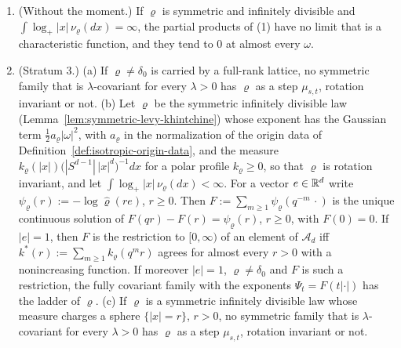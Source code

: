 \begin{proposition}
\begin{enumerate}
\item (Without the moment.) If $\varrho$ is symmetric and infinitely divisible and
$\int\log_+|x|\,\nu_\varrho(dx) = \infty$, the partial products of (1) have no limit that is a
characteristic function, and they tend to $0$ at almost every $\omega$.
\item (Stratum 3.) (a) If $\varrho \ne \delta_0$ is carried by a full-rank lattice, no symmetric
family that is $\lambda$-covariant for every $\lambda > 0$ has $\varrho$ as a step $\mu_{s,t}$,
rotation invariant or not. (b) Let $\varrho$ be the symmetric infinitely divisible law
(Lemma~\ref{lem:symmetric-levy-khintchine}) whose exponent has the Gaussian term $\tfrac12a_\varrho|\omega|^2$, with $a_\varrho$ in the normalization of the origin data of Definition~\ref{def:isotropic-origin-data}, and the \Levy{} measure
$k_\varrho(|x|)\bigl(|S^{d-1}|\,|x|^d\bigr)^{-1}dx$ for a polar profile $k_\varrho \ge 0$, so that
$\varrho$ is rotation invariant, and let $\int\log_+|x|\,\nu_\varrho(dx) < \infty$. For a vector
$e \in \mathbb{R}^d$ write $\psi_\varrho(r) := -\log\widehat\varrho(re)$, $r \ge 0$. Then
$F := \sum_{m \ge 1}\psi_\varrho(q^{-m}\,\cdot)$ is the unique continuous solution of
$F(qr) - F(r) = \psi_\varrho(r)$, $r \ge 0$, with $F(0) = 0$. If $|e| = 1$, then $F$ is the restriction to $[0,\infty)$ of an element of $\mathcal{A}_d$ iff $k^*(r) := \sum_{m \ge 1}k_\varrho(q^mr)$ agrees for almost every $r > 0$
with a nonincreasing function. If moreover $|e| = 1$, $\varrho \ne \delta_0$ and $F$ is such a restriction, the
fully covariant family with the exponents $\Psi_t = F(t|\cdot|)$ has the ladder of $\varrho$.
(c) If $\varrho$ is a symmetric infinitely divisible law whose \Levy{} measure charges a sphere
$\{|x| = r\}$, $r > 0$, no symmetric family that is $\lambda$-covariant for every $\lambda > 0$ has
$\varrho$ as a step $\mu_{s,t}$, rotation invariant or not.
\end{enumerate}
\end{proposition}

